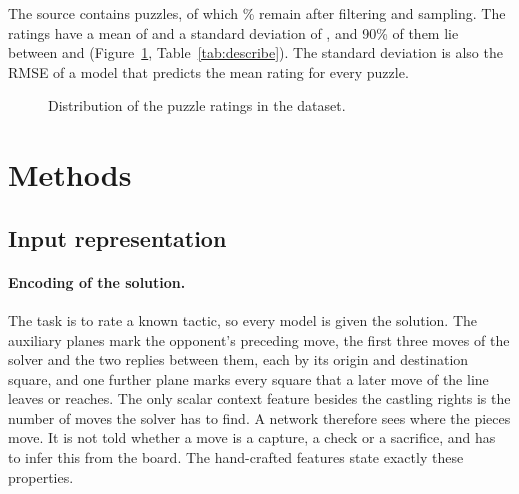 \documentclass[11pt]{article}
\begin{document}
\begin{table}[htbp]\centering\small
{}
\caption{Dataset statistics by split.}
\label{tab:data}
\end{table}

\iflook
The source contains  puzzles, of which
\% remain after filtering and sampling. The ratings
have a mean of  and a standard deviation of , and
90\% of them lie between  and 
(Figure~\ref{fig:label}, Table~\ref{tab:describe}). The standard deviation is
also the RMSE of a model that predicts the mean rating for every puzzle.

\begin{figure}[htbp]\centering
{}
\caption{Distribution of the puzzle ratings in the dataset.}
\label{fig:label}
\end{figure}

\begin{table}[htbp]\centering\small
{}
\caption{Summary statistics of selected variables over the whole dataset:
the mean, five quantiles, the minimum and the maximum.}
\label{tab:describe}
\end{table}
\fi

\section{Methods}
\label{sec:methods}

\subsection{Input representation}
\label{sec:input}



\paragraph{Encoding of the solution.}
The task is to rate a known tactic, so every model is given the solution. The
auxiliary planes mark the opponent's preceding move, the first three moves of
the solver and the two replies between them, each by its origin and
destination square, and one further plane marks every square that a later
move of the line leaves or reaches. The only scalar context feature besides
the castling rights is the number of moves the solver has to find. A network
therefore sees where the pieces move. It is not told whether a move is a
capture, a check or a sacrifice, and has to infer this from the board. The
hand-crafted features state exactly these properties.
\end{document}
